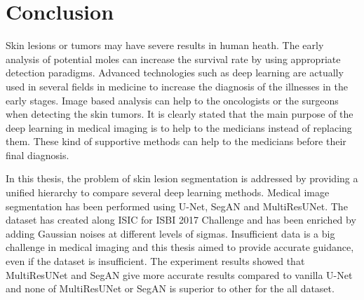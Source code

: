 \chapter{Conclusion}
\thispagestyle{empty}

Skin lesions or tumors may have severe results in human heath.
The early analysis of potential moles can increase the survival rate by using appropriate detection paradigms.
Advanced technologies such as deep learning are actually used in several fields in medicine to increase the diagnosis of the illnesses in the early stages.
Image based analysis can help to the oncologists or the surgeons when detecting the skin tumors.
It is clearly stated that the main purpose of the deep learning in medical imaging is to help to the medicians instead of replacing them.
These kind of supportive methods can help to the medicians before their final diagnosis.

In this thesis, the problem of skin lesion segmentation is addressed by providing a unified hierarchy to compare several deep learning methods.
Medical image segmentation has been performed using U-Net, SegAN and MultiResUNet.
The dataset has created along ISIC for ISBI 2017 Challenge and has been enriched by adding Gaussian noises at different levels of sigmas.
Insufficient data is a big challenge in medical imaging and this thesis aimed to provide accurate guidance, even if the dataset is insufficient.
The experiment results showed that MultiResUNet and SegAN give more accurate results compared to vanilla U-Net and none of MultiResUNet or SegAN is superior to other for the all dataset.
